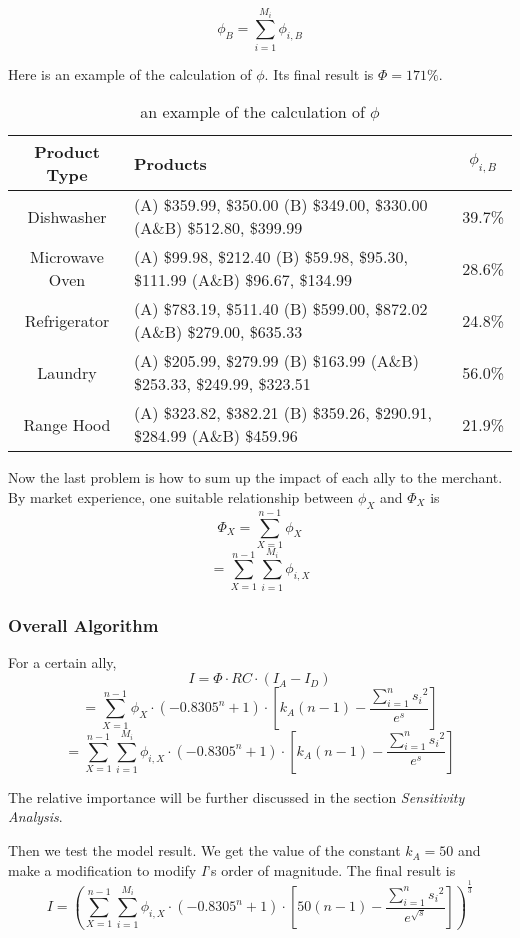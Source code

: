 \[  \phi_B = \sum\limits_{i=1}^{M_i} \phi_{i,B}  \]

Here is an example of the calculation of $\phi$. Its final result is $\Phi=171\%$.

\begin{table}[H]
\begin{tabular}{|c|p{}|c|}
\hline
Product Type & Products & $\phi_{i,B}$ \\
\hline
Dishwasher & \tabincell{l}{(A) \$359.99, \$350.00 \\ (B) \$349.00, \$330.00 \\ (A\&B) \$512.80, \$399.99} & 39.7\% \\
\hline
Microwave Oven & \tabincell{l}{(A) \$99.98, \$212.40 \\ (B) \$59.98, \$95.30, \$111.99 \\ (A\&B) \$96.67, \$134.99} & 28.6\% \\
\hline
Refrigerator & \tabincell{l}{(A) \$783.19, \$511.40 \\ (B) \$599.00, \$872.02 \\ (A\&B) \$279.00, \$635.33} & 24.8\% \\
\hline
Laundry & \tabincell{l}{(A) \$205.99, \$279.99 \\ (B) \$163.99 \\ (A\&B) \$253.33, \$249.99, \$323.51} & 56.0\% \\
\hline
Range Hood & \tabincell{l}{(A) \$323.82, \$382.21 \\ (B) \$359.26, \$290.91, \$284.99 \\ (A\&B) \$459.96} & 21.9\% \\
\hline
\end{tabular}
\caption{an example of the calculation of $\phi$}
\label{tab:phi_calc}
\end{table}

Now the last problem is how to sum up the impact of each ally to the merchant. By market experience, one suitable relationship between $\phi_X$ and $\Phi_{X}$ is
\[  \Phi_{X} = {\sum_{X=1}^{n-1} \phi_X}  \]
\[  = {\sum_{X=1}^{n-1} {\sum\limits_{i=1}^{M_i} \phi_{i,X}}}  \]

\subsubsection{Overall Algorithm}
For a certain ally,
\[  I = \Phi \cdot RC \cdot (I_A - I_D)  \]
\[  = {\sum_{X=1}^{n-1} \phi_X} \cdot (-0.8305^n+1) \cdot \left[k_A (n-1) - \frac{\sum_{i=1}^n {s_i}^2}{e^s}\right]   \]
\[  = {\sum_{X=1}^{n-1} {\sum\limits_{i=1}^{M_i} \phi_{i,X}}} \cdot (-0.8305^n+1) \cdot \left[k_A (n-1) - \frac{\sum_{i=1}^n {s_i}^2}{e^s}\right]  \]

The relative importance will be further discussed in the section \textsl{Sensitivity Analysis}.

Then we test the model result. We get the value of the constant $k_A=50$ and make a modification to modify $I$'s order of magnitude. The final result is
\begin{equation}
I = \left({\sum_{X=1}^{n-1} {\sum_{i=1}^{M_i} \phi_{i,X}}} \cdot (-0.8305^n+1) \cdot \left[50(n-1) - \frac{\sum_{i=1}^n {s_i}^2}{e^{\sqrt{s}}}\right]\right)^\frac{1}{3}
\label{eq:mtm_model}
\end{equation}
